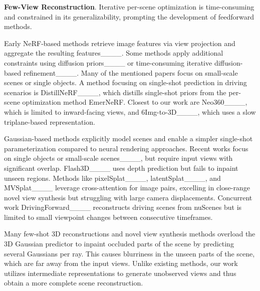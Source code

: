 \noindent \textbf{Few-View Reconstruction}. Iterative per-scene optimization is time-consuming and constrained in its generalizability, prompting the development of feedforward methods. 

Early NeRF-based methods retrieve image features via view projection and aggregate the resulting features____. Some methods apply additional constraints using diffusion priors____ or time-consuming iterative diffusion-based refinement____. Many of the mentioned papers focus on small-scale scenes or single objects. A method focusing on single-shot prediction in driving scenarios is DistillNeRF____, which distills single-shot priors from the per-scene optimization method EmerNeRF. Closest to our work are Neo360____, which is limited to inward-facing views, and 6Img-to-3D____, which uses a slow triplane-based representation.

Gaussian-based methods explicitly model scenes and enable a simpler single-shot parameterization compared to neural rendering approaches. Recent works focus on single objects or small-scale scenes____, but require input views with significant overlap. Flash3D____ uses depth prediction but fails to inpaint unseen regions. Methods like pixelSplat____, latentSplat____, and MVSplat____ leverage cross-attention for image pairs, excelling in close-range novel view synthesis but struggling with large camera displacements. Concurrent work DrivingForward____ reconstructs driving scenes from nuScenes but is limited to small viewpoint changes between consecutive timeframes.


Many few-shot 3D reconstructions and novel view synthesis methods overload the 3D Gaussian predictor to inpaint occluded parts of the scene by predicting several Gaussians per ray. This causes blurriness in the unseen parts of the scene, which are far away from the input views. Unlike existing methods, our work utilizes intermediate representations to generate unobserved views and thus obtain a more complete scene reconstruction.